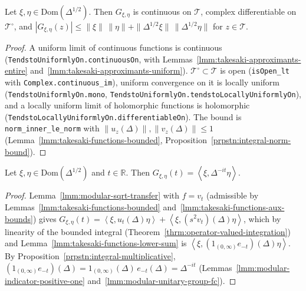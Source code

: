 \begin{lemma}
    \label{lmm:takesaki-function-analytic}
    \leanok
    Let $\xi, \eta \in \text{Dom}(\Delta^{1/2})$. Then $G_{\xi,\eta}$ is continuous on $\mathcal{T}$, complex differentiable on $\mathcal{T}^\circ$, and $|G_{\xi,\eta}(z)| \le \|\xi\|\,\|\eta\| + \|\Delta^{1/2}\xi\|\,\|\Delta^{1/2}\eta\|$ for $z \in \mathcal{T}$.
\end{lemma}
\begin{proof}
    \leanok
    A uniform limit of continuous functions is continuous (\texttt{TendstoUniformlyOn.continuousOn}, with Lemmas~\ref{lmm:takesaki-approximants-entire} and~\ref{lmm:takesaki-approximants-uniform}). $\mathcal{T}^\circ \subset \mathcal{T}$ is open (\texttt{isOpen\_lt} with \texttt{Complex.continuous\_im}), uniform convergence on it is locally uniform (\texttt{TendstoUniformlyOn.mono}, \texttt{TendstoUniformlyOn.tendstoLocallyUniformlyOn}), and a locally uniform limit of holomorphic functions is holomorphic (\texttt{TendstoLocallyUniformlyOn.differentiableOn}). The bound is \texttt{norm\_inner\_le\_norm} with $\|u_z(\Delta)\|, \|v_z(\Delta)\| \le 1$ (Lemma~\ref{lmm:takesaki-functions-bounded}, Proposition~\ref{prpstn:integral-norm-bound}).
\end{proof}

\begin{lemma}
    \label{lmm:takesaki-function-lower-boundary}
    \leanok
    Let $\xi, \eta \in \text{Dom}(\Delta^{1/2})$ and $t \in \mathbb{R}$. Then $G_{\xi,\eta}(t) = \left< \xi, \Delta^{-it}\eta \right>$.
\end{lemma}
\begin{proof}
    \leanok
    Lemma~\ref{lmm:modular-sqrt-transfer} with $f = v_t$ (admissible by Lemmas~\ref{lmm:takesaki-functions-bounded} and~\ref{lmm:takesaki-functions-aux-bounds}) gives $G_{\xi,\eta}(t) = \left< \xi, u_t(\Delta)\eta \right> + \left< \xi, (s^2v_t)(\Delta)\eta \right>$, which by linearity of the bounded integral (Theorem~\ref{thrm:operator-valued-integration}) and Lemma~\ref{lmm:takesaki-functions-lower-sum} is $\left< \xi, (1_{(0,\infty)}e_{-t})(\Delta)\eta \right>$. By Proposition~\ref{prpstn:integral-multiplicative}, $(1_{(0,\infty)}e_{-t})(\Delta) = 1_{(0,\infty)}(\Delta)\,e_{-t}(\Delta) = \Delta^{-it}$ (Lemmas~\ref{lmm:modular-indicator-positive-one} and~\ref{lmm:modular-unitary-group-fc}).
\end{proof}

